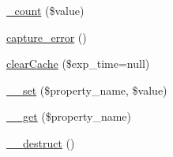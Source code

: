 \begin{DoxyCompactItemize}
\item 
\hyperlink{class_smarty___internal___template_a5c1d3995e4cadd10771dae84899536e5}{\+\_\+count} (\$value)
\item 
\hyperlink{class_smarty___internal___template_a49ecbf3f48fa93422edfb6e6480fd547}{capture\+\_\+error} ()
\item 
\hyperlink{class_smarty___internal___template_acd96963a5bcc7d9ccb152776ce7cd1d6}{clear\+Cache} (\$exp\+\_\+time=null)
\item 
\hyperlink{class_smarty___internal___template_a3a449beac9d0c7fdd8325b61b21f52a0}{\+\_\+\+\_\+set} (\$property\+\_\+name, \$value)
\item 
\hyperlink{class_smarty___internal___template_a51458d48bdbac63ccde60e4ae3357388}{\+\_\+\+\_\+get} (\$property\+\_\+name)
\item 
\hyperlink{class_smarty___internal___template_a421831a265621325e1fdd19aace0c758}{\+\_\+\+\_\+destruct} ()
\end{DoxyCompactItemize}
